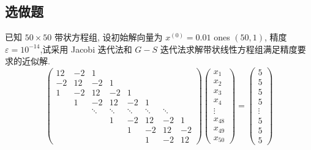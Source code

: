 \subsection{选做题}
\begin{ex}
	已知 $50 \times 50$ 带状方程组, 设初始解向量为 $x^{(0)}=0.01$ ones $(50,1)$, 精度 $\varepsilon=10^{-14}$,试采用 Jacobi 迭代法和 $G-S$ 迭代法求解带状线性方程组满足精度要求的近似解.
	$$
	\left(\begin{array}{llllllll}
		12 & -2 & 1 & & & & & \\
		-2 & 12 & -2 & 1 & & & & \\
		1 & -2 & 12 & -2 & 1 & & & \\
		& 1 & -2 & 12 & -2 & 1 & & \\
		& & \ddots & \ddots & \ddots & \ddots & \ddots & \\
		& & & 1 & -2 & 12 & -2 & 1 \\
		& & & & 1 & -2 & 12 & -2 \\
		& & & & & 1 & -2 & 12
	\end{array}\right)\left(\begin{array}{c}
		x_1 \\
		x_2 \\
		x_3 \\
		x_4 \\
		\vdots \\
		x_{48} \\
		x_{49} \\
		x_{50}
	\end{array}\right)=\left(\begin{array}{c}
		5 \\
		5 \\
		5 \\
		5 \\
		\vdots \\
		5 \\
		5 \\
		5
	\end{array}\right)
	$$
\end{ex}

\qa 

